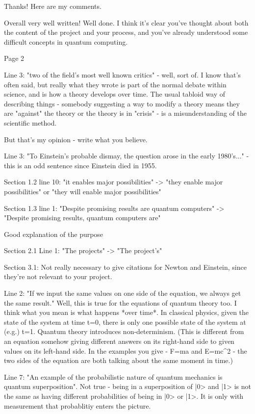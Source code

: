 Thanks! Here are my comments.

Overall very well written! Well done. I think it's clear you've thought about both the content of the project and your process, and you've already understood some difficult concepts in quantum computing.

Page 2

Line 3: "two of the field's most well known critics" - well, sort of. I know that's often said, but really what they wrote is part of the normal debate within science, and is how a theory develops over time. The usual tabloid way of describing things - somebody suggesting a way to modify a theory means they are "against" the theory or the theory is in "crisis" - is a misunderstanding of the scientific method.

But that's my opinion - write what you believe.

Line 3: "To Einstein’s probable dismay, the question arose in the early 1980’s..." - this is an odd sentence since Einstein died in 1955.

Section 1.2 line 10: "it enables major possibilities" -> "they enable major possibilities" or "they will enable major possibilities"

Section 1.3 line 1: "Despite promising results are quantum computers" -> "Despite promising results, quantum computers are"

Good explanation of the purpose

Section 2.1 Line 1: "The projects" -> "The project's"

Section 3.1: Not really necessary to give citations for Newton and Einstein, since they're not relevant to your project.

Line 2: "If we input the same values on one side of the equation, we always get the same result." Well, this is true for the equations of quantum theory too. I think what you mean is what happens *over time*. In classical physics, given the state of the system at time t=0, there is only one possible state of the system at (e.g.) t=1. Quantum theory introduces non-determinism. (This is different from an equation somehow giving different answers on its right-hand side to given values on its left-hand side. In the examples you give - F=ma and E=mc^2 - the two sides of the equation are both talking about the same moment in time.)

Line 7: "An example of the probabilistic nature of quantum mechanics is quantum superposition". Not true - being in a superposition of |0> and |1> is not the same as having different probabilities of being in |0> or |1>. It is only with measurement that probablitiy enters the picture.

